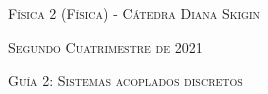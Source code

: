 \documentclass[11pt,spanish]{article}
\begin{document}
    \begin{center}
    \textsc{\large Física 2 (Física) - Cátedra Diana Skigin}
    \par\end{center}{\large \par}
    
    \begin{center}
    \textsc{\large Segundo Cuatrimestre de 2021}
    \par\end{center}{\large \par}
    
    \begin{center}
    \textsc{\large Guía 2: Sistemas acoplados discretos}
    \par\end{center}{\large \par}
\end{document}
